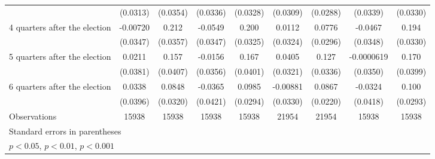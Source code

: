 \begin{table}[htbp]
\begin{tabular}{l*{8}{c}}
                    &    (0.0313)         &    (0.0354)         &    (0.0336)         &    (0.0328)         &    (0.0309)         &    (0.0288)         &    (0.0339)         &    (0.0330)         \\
[1em]
 4 quarters after the election&    -0.00720         &       0.212\sym{***}&     -0.0549         &       0.200\sym{***}&      0.0112         &      0.0776\sym{**} &     -0.0467         &       0.194\sym{***}\\
                    &    (0.0347)         &    (0.0357)         &    (0.0347)         &    (0.0325)         &    (0.0324)         &    (0.0296)         &    (0.0348)         &    (0.0330)         \\
[1em]
 5 quarters after the election&      0.0211         &       0.157\sym{***}&     -0.0156         &       0.167\sym{***}&      0.0405         &       0.127\sym{***}&  -0.0000619         &       0.170\sym{***}\\
                    &    (0.0381)         &    (0.0407)         &    (0.0356)         &    (0.0401)         &    (0.0321)         &    (0.0336)         &    (0.0350)         &    (0.0399)         \\
[1em]
 6 quarters after the election&      0.0338         &      0.0848\sym{**} &     -0.0365         &      0.0985\sym{***}&    -0.00881         &      0.0867\sym{***}&     -0.0324         &       0.100\sym{***}\\
                    &    (0.0396)         &    (0.0320)         &    (0.0421)         &    (0.0294)         &    (0.0330)         &    (0.0220)         &    (0.0418)         &    (0.0293)         \\
\hline
Observations        &       15938         &       15938         &       15938         &       15938         &       21954         &       21954         &       15938         &       15938         \\
\hline\hline
\multicolumn{9}{l}{\footnotesize Standard errors in parentheses}\\
\multicolumn{9}{l}{\footnotesize \sym{*} \(p<0.05\), \sym{**} \(p<0.01\), \sym{***} \(p<0.001\)}\\
\end{tabular}
\end{table}
